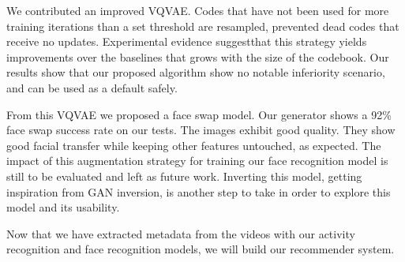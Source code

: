 We contributed an improved VQVAE. Codes that have not been used for more training iterations than a set threshold are resampled, prevented dead codes that receive no updates. Experimental evidence suggestthat this strategy yields improvements over the baselines that grows with the size of the codebook. Our results show that our proposed algorithm show no notable inferiority scenario, and can be used as a default safely.

From this VQVAE we proposed a face swap model. Our generator shows a 92\% face swap success rate on our tests. The images exhibit good quality. They show good facial transfer while keeping other features untouched, as expected. The impact of this augmentation strategy for training our face recognition model is still to be evaluated and left as future work. Inverting this model, getting inspiration from GAN inversion, is another step to take in order to explore this model and its usability.

Now that we have extracted metadata from the videos with our activity recognition and face recognition models, we will build our recommender system.

